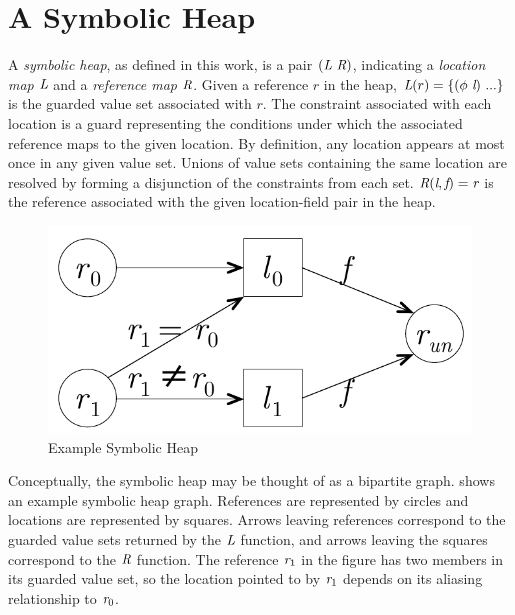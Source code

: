 \section{A Symbolic Heap}
A \emph{symbolic heap}, as defined in this work, is a pair
$(\emph{L}\ \emph{R})$, indicating a \emph{location map}
$\emph{L}$ and a \emph{reference map} $\emph{R}$.  Given a reference $r$ in the heap,
$\cfgnt{L}(r) = \{(\phi\ \cfgnt{l})\ ...\}$ is the guarded value set
associated with $r$. The constraint associated with each
location is a guard representing the conditions under which the
associated reference maps to the given location. By definition, any
location appears at most once in any given value set. Unions of value
sets containing the same location are resolved by forming a
disjunction of the constraints from each set. $\emph{R}(\emph{l},
\emph{f}) = \emph{r}$ is the reference associated with the given
location-field pair in the heap. 

\begin{figure}[t]
\begin{center}
\includegraphics[scale=0.5]{../figs/simple_heap_scratch.pdf}
\end{center}
\caption{Example Symbolic Heap}
\label{fig:exampleHeap}
\end{figure}

Conceptually, the symbolic heap may be thought of as a bipartite
graph.  shows an example symbolic heap
graph. References are represented by circles and locations are
represented by squares. Arrows leaving references correspond to the
guarded value sets returned by the $\emph{L}$ function, and arrows
leaving the squares correspond to the $\emph{R}$ function. The
reference $\emph{r}_1$ in the figure has two members in its guarded value set,
so the location pointed to by $\emph{r}_1$ depends on its aliasing
relationship to $\emph{r}_0$.

